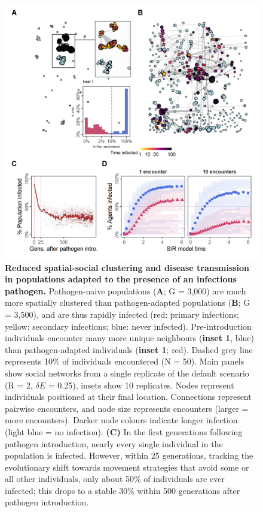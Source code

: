 \begin{figure}[!h]
    \centering
    \includegraphics[width=0.9\linewidth]{figures/pathomove/fig_networks_disease.png}
    \caption{
        \textbf{Reduced spatial-social clustering and disease transmission in populations adapted to the presence of an infectious pathogen.}
        Pathogen-naive populations (\textbf{A}; G = 3,000) are much more spatially clustered than pathogen-adapted populations (\textbf{B}; G = 3,500), and are thus rapidly infected (red: primary infections; yellow: secondary infections; blue: never infected).
        Pre-introduction individuals encounter many more unique neighbours (\textbf{inset 1}, blue) than pathogen-adapted individuals (\textbf{inset 1}; red). 
        Dashed grey line represents 10\% of individuals encountered (N = 50).
        Main panels show social networks from a single replicate of the default scenario (R = 2, $\delta E$ = 0.25), insets show 10 replicates. Nodes represent individuals positioned at their final location. Connections represent pairwise encounters, and node size represents encounters (larger = more encounters). Darker node colours indicate longer infection (light blue = no infection). 
        \textbf{(C)} In the first generations following pathogen introduction, nearly every single individual in the population is infected. However, within 25 generations, tracking the evolutionary shift towards movement strategies that avoid some or all other individuals, only about 50\% of individuals are ever infected; this drops to a stable 30\% within 500 generations after pathogen introduction.
}
\end{figure}
